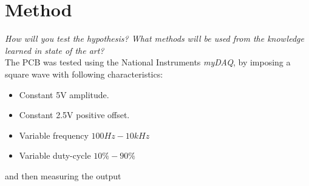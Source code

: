 \section{Method}
\textit{How will you test the hypothesis? What methods will be used from the knowledge learned in state of the art?}
\\The PCB was tested using the National Instruments \textit{myDAQ}, by imposing a square wave with following characteristics:
\begin{itemize}
        \item Constant 5V amplitude.
        \item Constant 2.5V positive offset.
        \item Variable frequency $100Hz-10kHz$
        \item Variable duty-cycle $10\% - 90\%$
\end{itemize}
and then measuring the output
